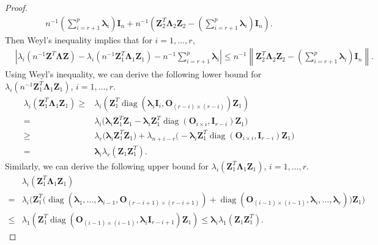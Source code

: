 \documentclass[12pt]{article} %
\DeclareMathOperator{\mydiag}{diag}
\newcommand{\bZ}{\mathbf{Z}}
\newcommand{\bO}{\mathbf{O}}
\newcommand{\bI}{\mathbf{I}}
\newcommand{\bfsym}[1]{\ensuremath{\boldsymbol{#1}}}
\def\blambda {\bfsym {\lambda}}
\def\bLambda {\bfsym {\Lambda}}
\theoremstyle{definition}
\begin{document}
\begin{appendices}
\begin{proof}
\begin{equation*}
\begin{split}
        n^{-1}(\sum_{i=r+1}^p\blambda_i)\bI_n+
        n^{-1}\left(\bZ_2^T \bLambda_2 \bZ_2-(\sum_{i=r+1}^p\blambda_i)\bI_n\right)
        .
        \end{split}
    \end{equation*}
    Then Weyl's inequality implies that for $ i=1,\ldots, r$,
    \begin{equation}\label{eigenBoundForF}
        \begin{split}
        &
        \left|
        \lambda_i\left(n^{-1}\bZ^T \bLambda \bZ\right)
        -
        \lambda_i(n^{-1}\bZ_1^T \bLambda_1 \bZ_1)
        -
        n^{-1}\sum_{i=r+1}^p\blambda_i
        \right|
        \leq
        n^{-1}\left\|\bZ_2^T \bLambda_2 \bZ_2-(\sum_{i=r+1}^p\blambda_i)\bI_n\right\|.
        \end{split}
    \end{equation}
    Using Weyl's inequality, we can derive the following lower bound for $\lambda_i(n^{-1}\bZ_1^T \bLambda_1 \bZ_1)$, $ i=1,\ldots, r$.
\begin{equation*}\label{eq:DLower}
\begin{aligned}
\lambda_i(\bZ_1^T \bLambda_1 \bZ_1)
\geq&
\lambda_i(\bZ_1^T \mydiag(\blambda_i \bI_{i},\bO_{(r-i)\times(r-i)}) \bZ_1)
\\
    =&
    \lambda_i\Big( \blambda_i \bZ_1^T \bZ_1-\blambda_i\bZ_1^T \mydiag(\bO_{i\times i}, \bI_{r-i}) \bZ_1\Big)\\
    \geq&
    \lambda_r\Big( \blambda_i \bZ_1^T \bZ_1\Big)+\lambda_{n+i-r}\Big(-\blambda_i\bZ_1^T \mydiag(\bO_{i\times i}, \bI_{r-i}) \bZ_1\Big)\\
= &
\blambda_i \lambda_r(\bZ_1\bZ_1^T).
\end{aligned}
\end{equation*}
Similarly, we can derive the following upper bound for
$\lambda_i(\bZ_1^T \bLambda_1 \bZ_1)$, $i=1,\ldots,r$.
\begin{equation*}\label{eq:DUpper}
\begin{aligned}
&\lambda_i(\bZ_1^T \bLambda_1 \bZ_1)
\\
=&\lambda_i\Big(
\bZ_1^T \big(
\mydiag(\blambda_1,\ldots,\blambda_{i-1},\bO_{(r-i+1)\times(r-i+1)})+
\mydiag(\bO_{(i-1)\times(i-1)},\blambda_i,\ldots,\blambda_r)
\big)
\bZ_1
\Big)\\
    \leq&
\lambda_1(\bZ_1^T \mydiag(\bO_{(i-1)\times(i-1)},\blambda_i \bI_{r-i+1}) \bZ_1)
\leq  \blambda_i \lambda_1(\bZ_1\bZ_1^T).

\end{aligned}
\end{equation*}
\end{proof}
\end{appendices}
\end{document}
